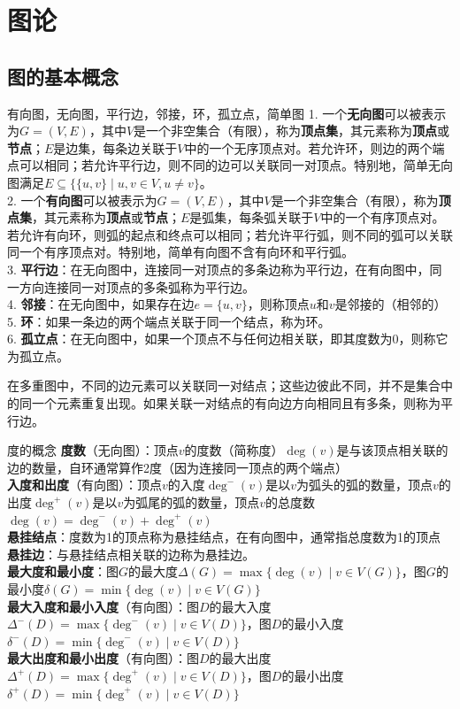 \documentclass[lang=cn,11pt]{elegantbook}
\begin{document}
\chapter{图论}
\section{图的基本概念}
\begin{definition}{有向图，无向图，平行边，邻接，环，孤立点，简单图}
1. 一个\textbf{无向图}可以被表示为$G = (V, E)$，其中$V$是一个非空集合（有限），称为\textbf{顶点集}，其元素称为\textbf{顶点}或\textbf{节点}；$E$是边集，每条边关联于$V$中的一个无序顶点对。若允许环，则边的两个端点可以相同；若允许平行边，则不同的边可以关联同一对顶点。特别地，简单无向图满足$E \subseteq \{\{u,v\} \mid u,v \in V, u \neq v\}$。\\
2. 一个\textbf{有向图}可以被表示为$G = (V, E)$，其中$V$是一个非空集合（有限），称为\textbf{顶点集}，其元素称为\textbf{顶点}或\textbf{节点}；$E$是弧集，每条弧关联于$V$中的一个有序顶点对。若允许有向环，则弧的起点和终点可以相同；若允许平行弧，则不同的弧可以关联同一个有序顶点对。特别地，简单有向图不含有向环和平行弧。\\
3.  \textbf{平行边}：在无向图中，连接同一对顶点的多条边称为平行边，在有向图中，同一方向连接同一对顶点的多条弧称为平行边。\\
4. \textbf{邻接}：在无向图中，如果存在边$e = \{u,v\}$，则称顶点$u$和$v$是邻接的（相邻的）\\
5. \textbf{环}：如果一条边的两个端点关联于同一个结点，称为环。\\
6. \textbf{孤立点}：在无向图中，如果一个顶点不与任何边相关联，即其度数为0，则称它为孤立点。
\end{definition}
在多重图中，不同的边元素可以关联同一对结点；这些边彼此不同，并不是集合中的同一个元素重复出现。如果关联一对结点的有向边方向相同且有多条，则称为平行边。
\begin{definition}{度的概念}
\textbf{度数}（无向图）：顶点$v$的度数（简称度）$\deg(v)$是与该顶点相关联的边的数量，自环通常算作2度（因为连接同一顶点的两个端点）\\
\textbf{入度和出度}（有向图）：顶点$v$的入度$\deg^-(v)$是以$v$为弧头的弧的数量，顶点$v$的出度$\deg^+(v)$是以$v$为弧尾的弧的数量，顶点$v$的总度数$\deg(v) = \deg^-(v) + \deg^+(v)$\\
\textbf{悬挂结点}：度数为1的顶点称为悬挂结点，在有向图中，通常指总度数为1的顶点\\
\textbf{悬挂边}：与悬挂结点相关联的边称为悬挂边。\\
\textbf{最大度和最小度}：图$G$的最大度$\Delta(G) = \max\{\deg(v) \mid v \in V(G)\}$，图$G$的最小度$\delta(G) = \min\{\deg(v) \mid v \in V(G)\}$\\
\textbf{最大入度和最小入度}（有向图）：图$D$的最大入度$\Delta^-(D) = \max\{\deg^-(v) \mid v \in V(D)\}$，图$D$的最小入度$\delta^-(D) = \min\{\deg^-(v) \mid v \in V(D)\}$\\
\textbf{最大出度和最小出度}（有向图）：图$D$的最大出度$\Delta^+(D) = \max\{\deg^+(v) \mid v \in V(D)\}$，图$D$的最小出度$\delta^+(D) = \min\{\deg^+(v) \mid v \in V(D)\}$
\end{definition}
\end{document}
